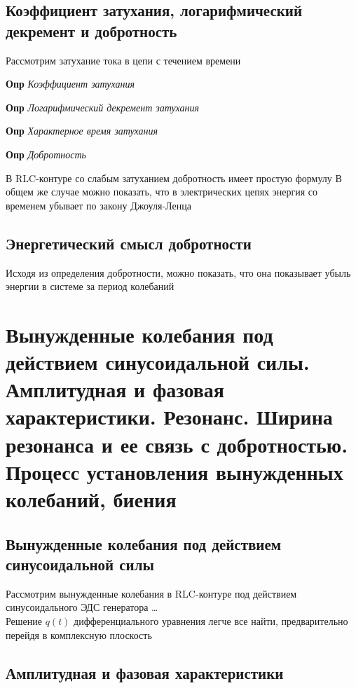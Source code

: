 \documentclass[a4paper, 14pt]{article}
\begin{document}
    \subsection{Коэффициент затухания, логарифмический декремент и добротность}
    
    Рассмотрим затухание тока в цепи с течением времени
    
    \textbf{Опр} \textit{Коэффициент затухания}
    
    \textbf{Опр} \textit{Логарифмический декремент затухания}
    
    \textbf{Опр} \textit{Характерное время затухания}
    
    \textbf{Опр} \textit{Добротность}
    
    В RLC-контуре со слабым затуханием добротность имеет простую формулу
    В общем же случае можно показать, что в электрических цепях энергия со временем убывает по закону Джоуля-Ленца
    
    \subsection{Энергетический смысл добротности}
    
    Исходя из определения добротности, можно показать, что она показывает убыль энергии в системе за период колебаний
    
    \section{Вынужденные колебания под действием синусоидальной силы.
    Амплитудная и фазовая характеристики.
    Резонанс.
    Ширина резонанса и ее связь с добротностью.
    Процесс установления вынужденных колебаний, биения}
    
    \subsection{Вынужденные колебания под действием синусоидальной силы}
    
    Рассмотрим вынужденные колебания в RLC-контуре под действием синусоидального ЭДС генератора \ldots \\
    Решение $q(t)$ дифференциального уравнения легче все найти, предварительно перейдя в комплексную плоскость
    
    \subsection{Амплитудная и фазовая характеристики}
    
\end{document}
